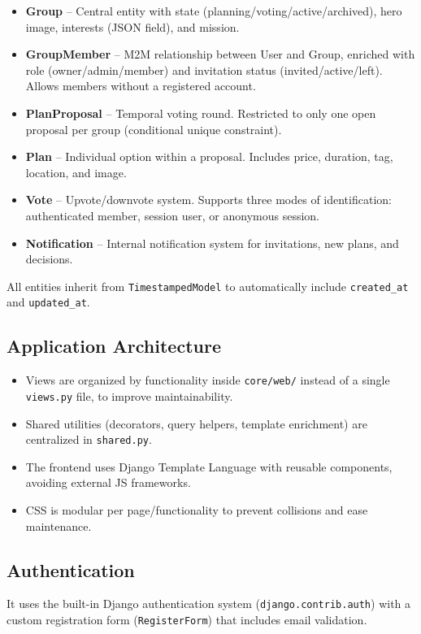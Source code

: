 \documentclass[a4paper,11pt]{article}
\begin{document}
\begin{itemize}[noitemsep]
    \item \textbf{Group} -- Central entity with state (planning/voting/active/archived), hero image, interests (JSON field), and mission.
    \item \textbf{GroupMember} -- M2M relationship between User and Group, enriched with role (owner/admin/member) and invitation status (invited/active/left). Allows members without a registered account.
    \item \textbf{PlanProposal} -- Temporal voting round. Restricted to only one open proposal per group (conditional unique constraint).
    \item \textbf{Plan} -- Individual option within a proposal. Includes price, duration, tag, location, and image.
    \item \textbf{Vote} -- Upvote/downvote system. Supports three modes of identification: authenticated member, session user, or anonymous session.
    \item \textbf{Notification} -- Internal notification system for invitations, new plans, and decisions.
\end{itemize}

\noindent All entities inherit from \texttt{TimestampedModel} to automatically include \texttt{created\_at} and \texttt{updated\_at}.

\subsection{Application Architecture}
\begin{itemize}
    \item Views are organized by functionality inside \texttt{core/web/} instead of a single \texttt{views.py} file, to improve maintainability.
    \item Shared utilities (decorators, query helpers, template enrichment) are centralized in \texttt{shared.py}.
    \item The frontend uses Django Template Language with reusable components, avoiding external JS frameworks.
    \item CSS is modular per page/functionality to prevent collisions and ease maintenance.
\end{itemize}

\subsection{Authentication}
It uses the built-in Django authentication system (\texttt{django.contrib.auth}) with a custom registration form (\texttt{RegisterForm}) that includes email validation.
\end{document}
